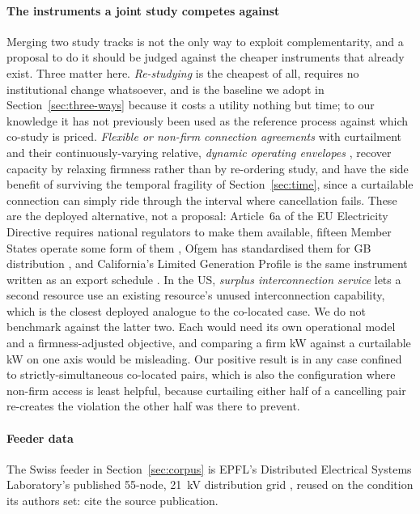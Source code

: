 \documentclass[review,authoryear,12pt]{elsarticle}
\begin{document}
\paragraph{The instruments a joint study competes against}
Merging two study tracks is not the only way to exploit complementarity, and a
proposal to do it should be judged against the cheaper instruments that already
exist. Three matter here. \emph{Re-studying} is the cheapest of all, requires no
institutional change whatsoever, and is the baseline we adopt in
Section~\ref{sec:three-ways} because it costs a utility nothing but time; to our knowledge it has not previously been used as the reference process
against which co-study is priced. \emph{Flexible or non-firm connection
agreements} with curtailment \citep{desanti2025,eurelectric2025} and their
continuously-varying relative, \emph{dynamic operating envelopes}
\citep{lankeshwara2025}, recover
capacity by relaxing firmness rather than by re-ordering study, and have the
side benefit of surviving the temporal fragility of
Section~\ref{sec:time}, since a curtailable connection can simply ride through
the interval where cancellation fails. These are the deployed alternative, not
a proposal: Article~6a of the EU Electricity Directive requires national
regulators to make them available, fifteen Member States operate some form of
them \citep{ec_gridconn2025}, Ofgem has standardised them for GB distribution
\citep{ofgem_accessscr2022}, and California's Limited Generation Profile is the
same instrument written as an export schedule \citep{cpuc_lgp2020}. In the US,
\emph{surplus interconnection service} \citep{ferc845_2018} lets a second
resource use an existing resource's unused interconnection capability, which is
the closest deployed analogue to the co-located case. We do not benchmark
against the latter two. Each would need its own operational model and a
firmness-adjusted objective, and comparing a firm kW against a curtailable kW
on one axis would be misleading. Our positive result is in any case confined to
strictly-simultaneous co-located pairs, which is also the configuration where
non-firm access is least helpful, because curtailing either half of a
cancelling pair re-creates the violation the other half was there to prevent.

\paragraph{Feeder data}
The Swiss feeder in Section~\ref{sec:corpus} is EPFL's Distributed
Electrical Systems Laboratory's published 55-node, 21~kV distribution grid
\citep{yi2022}, reused on the condition its authors set: cite the source
publication.
\end{document}
